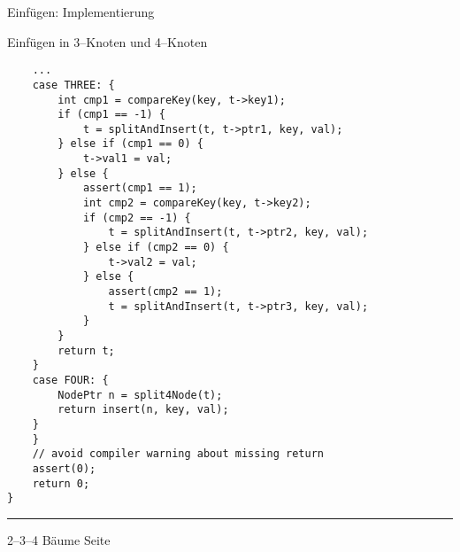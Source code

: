 \begin{slide}{}
\normalsize

\begin{center}
Einf\"ugen: Implementierung
\end{center}
\vspace*{0.5cm}

\footnotesize
Einf\"ugen in 3--Knoten und 4--Knoten
\begin{verbatim}
    ...
    case THREE: {
        int cmp1 = compareKey(key, t->key1);
        if (cmp1 == -1) {
            t = splitAndInsert(t, t->ptr1, key, val);
        } else if (cmp1 == 0) {
            t->val1 = val;
        } else {
            assert(cmp1 == 1);
            int cmp2 = compareKey(key, t->key2);
            if (cmp2 == -1) {
                t = splitAndInsert(t, t->ptr2, key, val);
            } else if (cmp2 == 0) {
                t->val2 = val;
            } else {
                assert(cmp2 == 1);
                t = splitAndInsert(t, t->ptr3, key, val);
            }
        }
        return t;
    }
    case FOUR: {
        NodePtr n = split4Node(t);
        return insert(n, key, val);
    }
    }
    // avoid compiler warning about missing return
    assert(0);
    return 0;
}
\end{verbatim}


\vspace*{\fill}
\tiny \addtocounter{mypage}{1}
\rule{17cm}{1mm}
2--3--4 B\"aume  \hspace*{\fill} Seite 
\end{slide}


